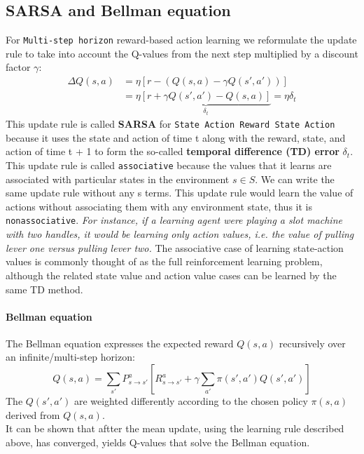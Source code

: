 \documentclass[11pt]{article}
\begin{document}
\subsection{SARSA and Bellman equation}
For \texttt{Multi-step horizon} reward-based action learning we reformulate the update rule to take into account the Q-values from the next step multiplied by a discount factor $\gamma$:
\begin{align*}
	\Delta Q(s,a) &= \eta \left[r-(Q(s,a) - \gamma Q(s', a'))\right]\\
&=\eta \underbrace{\left[r+\gamma Q(s', a')-Q(s,a)\right]}_{\delta_t}= \eta \delta_t
\end{align*}
This update rule is called \textbf{SARSA} for \texttt{State Action Reward State Action} because it uses the state and action of time t along with the reward, state, and action of time t + 1 to form the so-called \textbf{temporal difference (TD) error} $\delta_t$.
This update rule is called \texttt{associative} because the values that it learns are associated with particular states in the environment $s \in S$. We can write the same update rule without any s terms. This update rule would learn the value of actions without associating them with any environment state, thus it is \texttt{nonassociative}. \textit{For instance, if a learning agent were playing a slot machine with two handles, it would be learning only action values, i.e. the value of pulling lever one versus pulling lever two.} The associative case of learning state-action values is commonly thought of as the full reinforcement learning problem, although the related state value and action value cases can be learned by the same TD method.

\paragraph{Bellman equation}
The Bellman equation expresses the expected reward $Q(s,a)$ recursively over an infinite/multi-step horizon: 
\[
	Q(s,a) = \sum_{s'}P_{s \rightarrow s'}^a [R^a_{s \rightarrow s'} + \gamma \sum_{a'} \pi(s',a')Q(s',a')]
\]
The $Q(s',a')$ are weighted differently according to the chosen policy $\pi(s,a)$ derived from $Q(s,a)$.\\
It can be shown that aftter the mean update, using the learning rule described above, has converged, yields Q-values that solve the Bellman equation.
\end{document}
